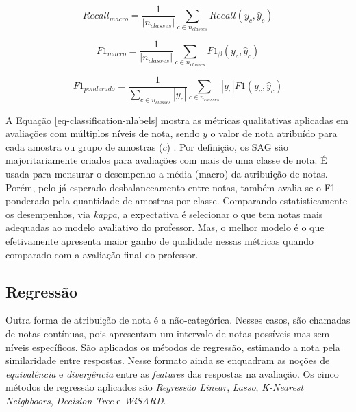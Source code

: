 \begin{equation*}
Recall_{macro} = \frac{1}{\left|n_{classes}\right|} \sum_{c \in n_{classes}} Recall(y_c, \hat{y}_c)
\end{equation*}

\begin{equation*}
F{1}_{macro} = \frac{1}{\left|n_{classes}\right|} \sum_{c \in n_{classes}} F{1}_\beta(y_c, \hat{y}_c)
\end{equation*}

\begin{equation*}
F{1}_{ponderado} = \frac{1}{\sum_{c \in n_{classes}} \left|y_c\right|} \sum_{c \in n_{classes}} \left|y_c\right| F{1}(y_c, \hat{y}_c)
\end{equation*}

A Equação \ref{eq-classification-nlabels} mostra as métricas qualitativas aplicadas em avaliações com múltiplos níveis de nota, sendo $y$ o valor de nota atribuído para cada amostra ou grupo de amostras ($c$) \cite{manning2008}. Por definição, os SAG são majoritariamente criados para avaliações com mais de uma classe de nota. É usada para mensurar o desempenho a média (macro) da atribuição de notas. Porém, pelo já esperado desbalanceamento entre notas, também avalia-se o F1 ponderado pela quantidade de amostras por classe. Comparando estatisticamente os desempenhos, via \textit{kappa}, a expectativa é selecionar o que tem notas mais adequadas ao modelo avaliativo do professor. Mas, o melhor modelo é o que efetivamente apresenta maior ganho de qualidade nessas métricas quando comparado com a avaliação final do professor.


\subsection{Regressão}
\label{subsec-regressao}

Outra forma de atribuição de nota é a não-categórica. Nesses casos, são chamadas de notas contínuas, pois apresentam um intervalo de notas possíveis mas sem níveis específicos. São aplicados os métodos de regressão, estimando a nota pela similaridade entre respostas. Nesse formato ainda se enquadram as noções de \textit{equivalência} e \textit{divergência} entre as \textit{features} das respostas na avaliação. Os cinco métodos de regressão aplicados são \textit{Regressão Linear}, \textit{Lasso}, \textit{K-Nearest Neighboors}, \textit{Decision Tree} e \textit{WiSARD}.

